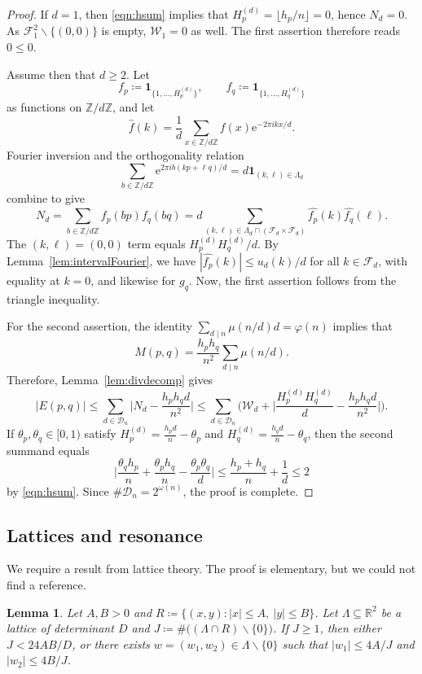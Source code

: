 \documentclass[12pt]{amsart}
\newtheorem{lemma}[theorem]{Lemma}
\theoremstyle{definition}
\newcommand{\Z}{\mathbb{Z}}
\newcommand{\e}{\mathrm{e}}
\newcommand{\R}{\mathbb{R}}
\begin{document}
\begin{proof}
If $d=1$, then \eqref{eqn:hsum} implies that $H^{(d)}_p=\lfloor h_p/n\rfloor=0$, hence $N_d=0$.  As $\mathcal{F}_1^2\smallsetminus\{(0,0)\}$ is empty, $\mathcal{W}_1=0$ as well.  The first assertion therefore reads $0\le0$.

Assume then that $d\ge2$.  Let
\[
f_p\coloneq \mathbf{1}_{\{1,\dots,H^{(d)}_p\}},\qquad f_q\coloneq \mathbf{1}_{\{1,\dots,H^{(d)}_q\}}
\]
as functions on $\Z/d\Z$, and let
\[
\widehat{f}(k)=\frac1d\sum_{x\in \Z/d\Z}f(x)\e^{-2\pi ikx/d}.
\]
Fourier inversion and the orthogonality relation
\[
\sum_{b\in\Z/d\Z}\e^{2\pi ib(kp+\ell q)/d}=d \mathbf{1}_{(k,\ell)\in\Lambda_d}
\]
combine to give
\[
N_d=\sum_{b\in\Z/d\Z}f_p(bp)f_q(bq)=d\!\!\sum_{(k,\ell)\in\Lambda_d\cap(\mathcal{F}_d\times \mathcal{F}_d)}\!\!\widehat{f_p}(k) \widehat{f_q}(\ell).
\]
The $(k,\ell)=(0,0)$ term equals $H^{(d)}_pH^{(d)}_q/d$.  By Lemma~\ref{lem:intervalFourier}, we have $|\widehat{f_p}(k)|\le u_d(k)/d$ for all $k\in\mathcal{F}_d$, with equality at $k=0$, and likewise for $g_q$.  Now, the first assertion follows from the triangle inequality.

For the second assertion, the identity $\sum_{d\mid n}\mu(n/d)d=\varphi(n)$ implies that
\[
M(p,q)=\frac{h_ph_q}{n^2}\sum_{d\mid n}\mu(n/d).
\]
Therefore, Lemma~\ref{lem:divdecomp} gives
\[
|E(p,q)|\le\sum_{d\in\mathcal{D}_n}\Big|N_d-\frac{h_ph_qd}{n^2}\Big| \le\sum_{d\in\mathcal{D}_n}\Big(\mathcal{W}_d+\Big|\frac{H^{(d)}_pH^{(d)}_q}{d}-\frac{h_ph_qd}{n^2}\Big|\Big).
\]
If $\theta_p,\theta_q\in[0,1)$ satisfy $H^{(d)}_p=\frac{h_pd}{n}-\theta_p$ and $H^{(d)}_q=\frac{h_qd}{n}-\theta_q$, then the second summand equals
\[
\Big|\frac{\theta_qh_p}{n}+\frac{\theta_ph_q}{n}-\frac{\theta_p\theta_q}{d}\Big|\leq \frac{h_p+h_q}{n}+\frac1d\le2
\]
by \eqref{eqn:hsum}.  Since $\#\mathcal{D}_n=2^{\omega(n)}$, the
proof is complete.
\end{proof}

\subsection{Lattices and resonance}

We require a result from lattice theory.  The proof is elementary, but we could not find a reference.

\begin{lemma}
\label{lem:lattice}
Let $A,B>0$ and $R\coloneq \{(x,y)\colon|x|\le A,\ |y|\le B\}$.  Let $\Lambda\subseteq\R^2$ be a lattice of determinant $D$ and  $J\coloneq \#\big((\Lambda\cap R)\smallsetminus\{0\}\big)$.  If $J\ge1$, then either $J<24AB/D$, or there exists $w=(w_1,w_2)\in\Lambda\smallsetminus\{0\}$ such that $|w_1|\le4A/J$ and $|w_2|\le4B/J$.
\end{lemma}
\end{document}

